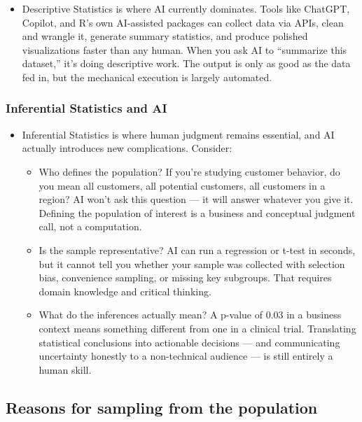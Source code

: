 \documentclass[
  letterpaper,
  DIV=11,
  numbers=noendperiod]{scrreprt}
\providecommand{\tightlist}{%
  \setlength{\itemsep}{0pt}\setlength{\parskip}{0pt}}\usepackage{longtable,booktabs,array}
\begin{document}
\begin{itemize}
\tightlist
\item
  Descriptive Statistics is where AI currently dominates. Tools like
  ChatGPT, Copilot, and R's own AI-assisted packages can collect data
  via APIs, clean and wrangle it, generate summary statistics, and
  produce polished visualizations faster than any human. When you ask AI
  to ``summarize this dataset,'' it's doing descriptive work. The output
  is only as good as the data fed in, but the mechanical execution is
  largely automated.
\end{itemize}

\subsubsection{Inferential Statistics and
AI}\label{inferential-statistics-and-ai}

\begin{itemize}
\tightlist
\item
  Inferential Statistics is where human judgment remains essential, and
  AI actually introduces new complications. Consider:

  \begin{itemize}
  \tightlist
  \item
    Who defines the population? If you're studying customer behavior, do
    you mean all customers, all potential customers, all customers in a
    region? AI won't ask this question --- it will answer whatever you
    give it. Defining the population of interest is a business and
    conceptual judgment call, not a computation.
  \item
    Is the sample representative? AI can run a regression or t-test in
    seconds, but it cannot tell you whether your sample was collected
    with selection bias, convenience sampling, or missing key subgroups.
    That requires domain knowledge and critical thinking.
  \item
    What do the inferences actually mean? A p-value of 0.03 in a
    business context means something different from one in a clinical
    trial. Translating statistical conclusions into actionable decisions
    --- and communicating uncertainty honestly to a non-technical
    audience --- is still entirely a human skill.
  \end{itemize}
\end{itemize}

\subsection{Reasons for sampling from the
population}\label{reasons-for-sampling-from-the-population}
\end{document}
